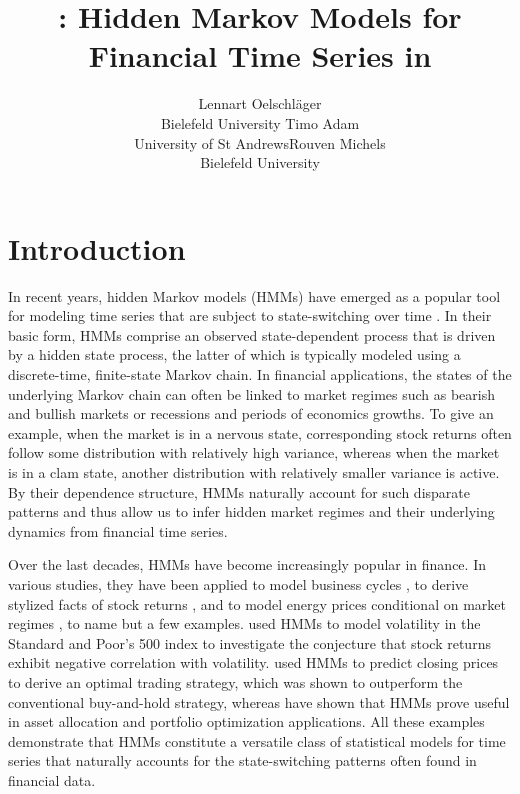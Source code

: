 \documentclass[article]{jss}
\author{Lennart Oelschl\"ager \\Bielefeld University \And Timo Adam \\University of St Andrews\And Rouven Michels \\Bielefeld University}
\title{\pkg{fHMM}: Hidden Markov Models for Financial Time Series in \proglang{R}}
\newcommand{\fct}[1]{\code{#1()}}
\begin{document}



\section{Introduction}
\label{sec:intro} %

In recent years, hidden Markov models (HMMs) have emerged as a popular tool for modeling time series that are subject to state-switching over time \citep{zuc16}. In their basic form, HMMs comprise an observed state-dependent process that is driven by a hidden state process, the latter of which is typically modeled using a discrete-time, finite-state Markov chain. In financial applications, the states of the underlying Markov chain can often be linked to market regimes such as bearish and bullish markets or recessions and periods of economics growths. To give an example, when the market is in a nervous state, corresponding stock returns often follow some distribution with relatively high variance, whereas when the market is in a clam state, another distribution with relatively smaller variance is active. By their dependence structure, HMMs naturally account for such disparate patterns and thus allow us to infer hidden market regimes and their underlying dynamics from financial time series.

Over the last decades, HMMs have become increasingly popular in finance. In various studies, they have been applied to model business cycles \citep{kim98, gre00}, to derive stylized facts of stock returns \citep{bul06, nys15a}, and to model energy prices conditional on market regimes \citep{lan18, ada19c, ada22}, to name but a few examples. \cite{lih17} used HMMs to model volatility in the Standard and Poor's 500 index to investigate the conjecture that stock returns exhibit negative correlation with volatility. \cite{ngu18} used HMMs to predict closing prices to derive an optimal trading strategy, which was shown to outperform the conventional buy-and-hold strategy, whereas \cite{bul11, nys15a, nys18} have shown that HMMs prove useful in asset allocation and portfolio optimization applications. All these examples demonstrate that HMMs constitute a versatile class of statistical models for time series that naturally accounts for the state-switching patterns often found in financial data.
\end{document}
